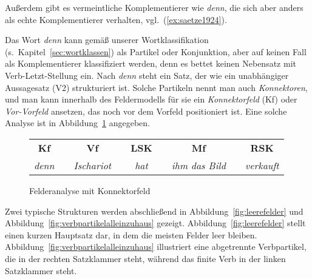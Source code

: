 Außerdem gibt es vermeintliche Komplementierer wie \textit{denn}, die sich aber anders als echte Komplementierer verhalten, vgl.\ (\ref{ex:saetze1924}).

\begin{exe}
  \ex\label{ex:saetze1924}
  \begin{xlist}
  \end{xlist}
\end{exe}


Das Wort \textit{denn} kann gemäß unserer Wortklassifikation (s.\ Kapitel~\ref{sec:wortklassen}) als Partikel oder Konjunktion, aber auf keinen Fall als Komplementierer klassifiziert werden, denn es bettet keinen Nebensatz mit Verb-Letzt-Stellung ein.
Nach \textit{denn} steht ein Satz, der wie ein unabhängiger Aussagesatz (V2) strukturiert ist.
Solche Partikeln nennt man auch \textit{Konnektoren}, und man kann innerhalb des Feldermodells für sie ein \textit{Konnektorfeld} (Kf) oder \textit{Vor-Vorfeld} ansetzen, das noch vor dem Vorfeld positioniert ist.
Eine solche Analyse ist in Abbildung~\ref{fig:konnektorfeld} angegeben.

\begin{figure}[!htbp]
  \centering
  \begin{tabular}{cp{0.1em}cp{0.1em}cp{0.1em}cp{0.1em}c}
    \textbf{Kf} && \textbf{Vf} && \textbf{LSK} && \textbf{Mf} && \textbf{RSK} \\
    \cmidrule{1-1}\cmidrule{3-3}\cmidrule{5-5}\cmidrule{7-7}\cmidrule{9-9}
    \textit{denn} && \textit{Ischariot} && \textit{hat} && \textit{ihm das Bild} && \textit{verkauft} \\
  \end{tabular}
  \caption{Felderanalyse mit Konnektorfeld}
  \label{fig:konnektorfeld}
\end{figure}

Zwei typische Strukturen werden abschließend in Abbildung~\ref{fig:leerefelder} und Abbildung~\ref{fig:verbpartikelalleinzuhaus} gezeigt.
Abbildung~\ref{fig:leerefelder} stellt einen kurzen Hauptsatz dar, in dem die meisten Felder leer bleiben.
Abbildung~\ref{fig:verbpartikelalleinzuhaus} illustriert eine abgetrennte Verbpartikel, die in der rechten Satzklammer steht, während das finite Verb in der linken Satzklammer steht.

